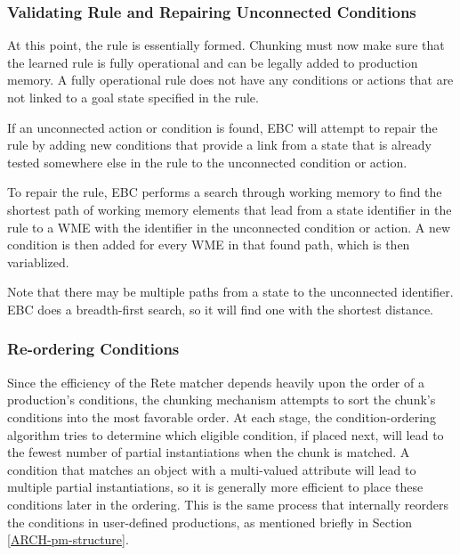 \subsubsection{Validating Rule and Repairing Unconnected Conditions}
\label{CHUNKING-repair}
At this point, the rule is essentially formed.  Chunking must now make sure that the learned rule is fully operational and can be legally added to production memory.  A fully operational rule does not have any conditions or actions that are not linked to a goal state specified in the rule. 

If an unconnected action or condition is found, EBC will attempt to repair the rule by adding new conditions that provide a link from a state that is already tested somewhere else in the rule to the unconnected condition or action.

To repair the rule, EBC performs a search through working memory to find the shortest path of working memory elements that lead from a state identifier in the rule to a WME with the identifier in the unconnected condition or action.  A new condition is then added for every WME in that found path, which is then variablized.

Note that there may be multiple paths from a state to the unconnected identifier.  EBC does a breadth-first search, so it will find one with the shortest distance.  

\subsubsection{Re-ordering Conditions}

Since the efficiency of the Rete matcher depends heavily upon the order of a production's conditions, the chunking mechanism attempts to sort the chunk's conditions into the most favorable order. At each stage, the condition-ordering algorithm tries to determine which eligible condition, if placed next, will lead to the fewest number of partial instantiations when the chunk is matched. A condition that matches an object with a multi-valued attribute will lead to multiple partial instantiations, so it is generally more efficient to place these conditions later in the ordering.  This is the same process that internally reorders the conditions in user-defined productions, as mentioned briefly in Section \ref{ARCH-pm-structure}.


